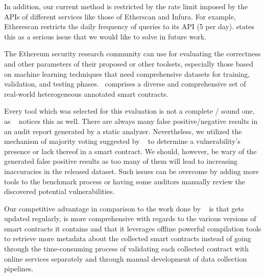     In addition, our current method is restricted by the rate limit imposed by the APIs of different services like those of Etherscan and Infura.
    For example, Etherescan restricts the daily frequency of queries to its API (5 per day).
    \cite{yashavant2022scrawld} states this as a serious issue that we would like to solve in future work.

    The Ethereum security research community can use \etherbase for evaluating the correctness and other parameters of their proposed or other toolsets,
    especially those based on machine learning techniques that need comprehensive datasets for training, validation, and testing phases.
    \etherbase~comprises a diverse and comprehensive set of real-world heterogeneous annotated smart contracts.
    
    Every tool which was selected for this evaluation is not a complete / sound one, as ~\cite{yashavant2022scrawld} notices this as well.
    There are always many false positive/negative results in an audit report generated by a static analyzer.
    Nevertheless, we utilized the mechanism of majority voting suggested by ~\cite{yashavant2022scrawld}
    to determine a vulnerability's presence or lack thereof in a smart contract.
    We should, however, be wary of the generated false positive results as too many of them will lead to increasing inaccuracies in the released dataset.
    Such issues can be overcome by adding more tools to the benchmark process or having some auditors manually review the discovered potential vulnerabilities.
    
    Our competitive advantage in comparison to the work done by ~\cite{yashavant2022scrawld} is that \etherbase gets updated regularly, is more comprehensive with regards to the various versions of smart contracts it contains and that it leverages offline powerful compilation tools to retrieve more metadata about the collected smart contracts instead of going through the time-consuming process of validating each collected contract with online services separately and through manual development of data collection pipelines.